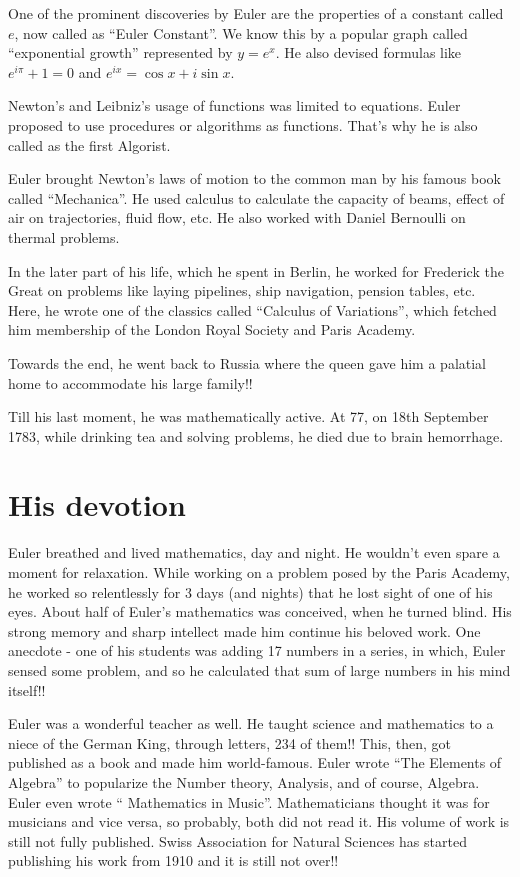 \documentclass[12pt]{article}
\begin{document}
One of the prominent discoveries by Euler are the properties of a constant called $e$, now called as ``Euler Constant''. We know this by a popular graph called ``exponential growth'' represented by $y = e^x$. He also devised formulas like $e^{i\pi} + 1 = 0$ and $e^{ix} = \cos x + i \sin x$.

Newton's and Leibniz's usage of functions was limited to equations. Euler proposed to use procedures or algorithms as functions. That's why he is also called as the first Algorist.

Euler brought Newton's laws of motion to the common man by his famous book called ``Mechanica''. He used calculus to calculate the capacity of beams, effect of air on trajectories, fluid flow, etc. He also worked with Daniel Bernoulli on thermal problems.

In the later part of his life, which he spent in Berlin, he  worked for Frederick the Great on problems like laying pipelines, ship navigation, pension tables, etc. Here, he wrote one of the classics called ``Calculus of Variations'', which fetched him membership of the London Royal Society and Paris Academy.

Towards the end, he went back to Russia where the queen gave him a palatial home to accommodate his large family!!

Till his last moment, he was mathematically active. At 77, on 18th September 1783, while drinking tea and solving problems, he died due to brain hemorrhage.


\section*{His devotion}
Euler breathed and lived mathematics, day and night. He wouldn't even spare a moment for relaxation. While working on a problem posed by the Paris Academy, he worked so relentlessly for 3 days (and nights) that he lost sight of one of his eyes. About half of Euler's mathematics was conceived, when he turned blind. His strong memory and sharp intellect made him continue his beloved work. One anecdote - one of his students was adding 17 numbers in a series, in which, Euler sensed some problem, and so he calculated that sum of large numbers in his mind itself!!

Euler was a wonderful teacher as well. He taught science and mathematics to a niece of the German King,  through letters, 234 of them!! This, then, got published as a book and made him world-famous. Euler wrote ``The Elements of Algebra'' to popularize the Number theory, Analysis, and of course, Algebra. Euler even wrote `` Mathematics in Music''. Mathematicians thought it was for musicians and vice versa, so probably, both did not read it. His volume of work is still not fully published. Swiss Association for Natural Sciences has started publishing his work from 1910 and it is still not over!!
\end{document}
